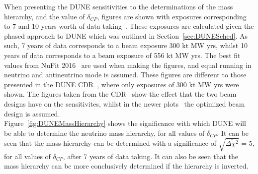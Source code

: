 When presenting the DUNE sensitivities to the determinations of the mass hierarchy, and the value of $\delta_{CP}$, figures are shown with exposures corresponding to 7 and 10 years worth of data taking~\citep{Elizabeth_01_17}. These exposures are calculated given the phased approach to DUNE which was outlined in Section~\ref{sec:DUNESched}. As such, 7 years of data corresponds to a beam exposure 300 kt MW yrs, whilst 10 years of data corresponds to a beam exposure of 556 kt MW yrs. The best fit values from NuFit 2016~\citep{NuFit2016} are used when making the figures, and equal running in neutrino and antineutrino mode is assumed. These figures are different to those presented in the DUNE CDR~\citep{DUNECDR_V2}, where only exposures of 300 kt MW yrs were shown. The figures taken from the CDR~\citep{DUNECDR_V2} show the effect that the two beam designs have on the sensitivites, whilst in the newer plots~\citep{DUNE2332, DUNE2335, DUNE2377, DUNE2401, DUNE2407} the optimized beam design is assumed. \\

Figure~\ref{fig:DUNEMassHierarchy} shows the significance with which DUNE will be able to determine the neutrino mass hierarchy, for all values of $\delta_{CP}$. It can be seen that the mass hierarchy can be determined with a significance of $\sqrt{\overline{\Delta{\chi^2}}}$ = 5, for all values of $\delta_{CP}$, after 7 years of data taking. It can also be seen that the mass hierarchy can be more conclusively determined if the hierarchy is inverted. \\

